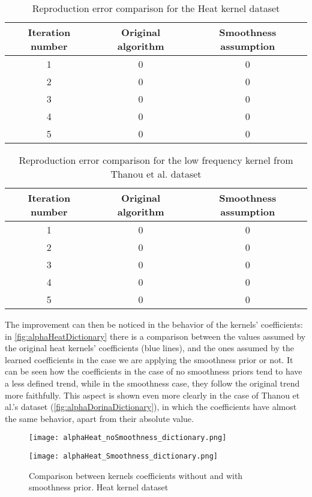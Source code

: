 \begin{table}[htbp]
  \centering
  \begin{tabular}{c|c|c}
    \multicolumn{1}{c|}{\textbf{Iteration number}} &
    \multicolumn{1}{c}{\textbf{Original algorithm}} &
    \multicolumn{1}{|c}{\textbf{Smoothness assumption}}\\
    \hline
    1 & 0 & 0\\
    2 & 0 & 0\\
    3 & 0 & 0\\
    4 & 0 & 0\\
    5 & 0 & 0\\
  \end{tabular}
  \caption{Reproduction error comparison for the Heat kernel dataset}
  \label{tab:errorHeat}
\end{table}

\begin{table}[htbp]
  \centering
  \begin{tabular}{c|c|c}
    \multicolumn{1}{c|}{\textbf{Iteration number}} &
    \multicolumn{1}{c}{\textbf{Original algorithm}} &
    \multicolumn{1}{|c}{\textbf{Smoothness assumption}}\\
    \hline
    1 & 0 & 0\\
    2 & 0 & 0\\
    3 & 0 & 0\\
    4 & 0 & 0\\
    5 & 0 & 0\\
  \end{tabular}
  \caption{Reproduction error comparison for the low frequency kernel from Thanou et al. dataset}
  \label{tab:errorDorina}
\end{table}

The improvement can then be noticed in the behavior of the kernels' coefficients: in \autoref{fig:alphaHeatDictionary} there is a comparison between the values assumed by the original heat kernels' coefficients (blue lines), and the ones assumed by the learned coefficients in the case we are applying the smoothness prior or not. It can be seen how the coefficients in the case of no smoothness priors tend to have a less defined trend, while in the smoothness case, they follow the original trend more faithfully. This aspect is shown even more clearly in the case of Thanou et al.'s dataset (\autoref{fig:alphaDorinaDictionary}), in which the coefficients have almost the same behavior, apart from their absolute value.

\begin{figure}
  \centering
  \begin{minipage}[c]{.8\textwidth}
    \centering
    \texttt{[image: alphaHeat\_noSmoothness\_dictionary.png]}
  \end{minipage}
  \begin{minipage}[c]{.8\textwidth}
    \centering
    \texttt{[image: alphaHeat\_Smoothness\_dictionary.png]}
  \end{minipage}
  \caption{Comparison between kernels coefficients without and with smoothness prior. Heat kernel   dataset}
  \label{fig:alphaHeatDictionary}
\end{figure}

